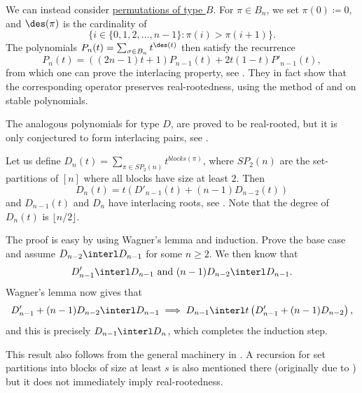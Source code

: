 \begin{example*}

We can instead consider \hyperref[permutationsTypeB]{permutations of type $B$}.
For $\pi \in B_n$, we set $\pi(0)\coloneqq 0$, and $\des(\pi)$ is the cardinality of
\[
 \{ i \in \{0,1,2,\dotsc,n-1\} : \pi(i) \gt \pi(i+1) \}.
\]
The polynomials $P_n(t) = \sum_{\sigma \in B_n} t^{\des(t)}$ then satisfy the recurrence
\begin{equation}
 P_n(t) = ((2n-1)t+1) P_{n-1}(t) + 2t(1-t) P'_{n-1}(t),
\end{equation}
from which one can prove the interlacing property, see \cite{Chow2022}.
They in fact show that the corresponding operator preserves
real-rootedness, using the method of  and  on stable polynomials.

The analogous polynomials for type $D$, are proved to be real-rooted, but it is only conjectured
to form interlacing pairs, see \cite[Section 5]{Chow2022}.
\end{example*}



\begin{example*}

Let us define $D_n(t) = \sum_{\pi \in SP_2(n)} t^{blocks(\pi)}$,
where $SP_2(n)$ are the set-partitions of $[n]$ where all blocks have size at least $2$.
Then
\[
 D_n(t) = t\left( D'_{n-1}(t) + (n-1) D_{n-2}(t) \right)
\]
and $D_{n-1}(t)$ and $D_{n}$ have interlacing roots, see \cite[Thm. 1]{BonaHezo2016}.
Note that the degree of $D_n(t)$ is $\lfloor n/2 \rfloor$.


The proof is easy by using Wagner's lemma and induction.
Prove the base case and assume $D_{n-2} \interl D_{n-1}$ for some $n \geq 2$.
We then know that
\[
D'_{n-1} \interl D_{n-1} \text{ and } (n-1)D_{n-2} \interl D_{n-1}.
\]
Wagner's lemma now gives that
\[
D'_{n-1} + (n-1)D_{n-2} \interl D_{n-1} \implies D_{n-1} \interl t \left( D'_{n-1} + (n-1)D_{n-2} \right),
\]
and this is precisely  $D_{n-1} \interl D_{n}$, which completes the induction step.

This result also follows from the general machinery in \cite[Subsection 3.4]{Hitczenko2024x}.
A recursion for set partitions into blocks of size at least $s$ is also mentioned
there (originally due to )
but it does not immediately imply real-rootedness.

\end{example*}

